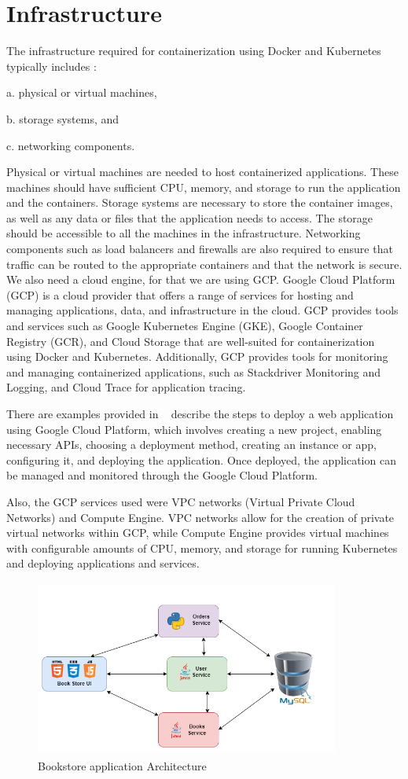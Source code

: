 \section{Infrastructure}
The infrastructure required for containerization using Docker and Kubernetes typically includes :

a. physical or virtual machines,

b. storage systems, and 

c. networking components. 

Physical or virtual machines are needed to host containerized applications. These machines should have sufficient CPU, memory, and storage to run the application and the containers. Storage systems are necessary to store the container images, as well as any data or files that the application needs to access. The storage should be accessible to all the machines in the infrastructure. Networking components such as load balancers and firewalls are also required to ensure that traffic can be routed to the appropriate containers and that the network is secure.
We also need a cloud engine, for that we are using GCP. Google Cloud Platform (GCP) is a cloud provider that offers a range of services for hosting and managing applications, data, and infrastructure in the cloud. GCP provides tools and services such as Google Kubernetes Engine (GKE), Google Container Registry (GCR), and Cloud Storage that are well-suited for containerization using Docker and Kubernetes. Additionally, GCP provides tools for monitoring and managing containerized applications, such as Stackdriver Monitoring and Logging, and Cloud Trace for application tracing.

There are examples provided in ~\cite{gupta2020deploy} describe the steps to deploy a web application using Google Cloud Platform, which involves creating a new project, enabling necessary APIs, choosing a deployment method, creating an instance or app, configuring it, and deploying the application. Once deployed, the application can be managed and monitored through the Google Cloud Platform.

Also, the GCP services used were VPC networks (Virtual Private Cloud Networks) and Compute Engine. VPC networks allow for the creation of private virtual networks within GCP, while Compute Engine provides virtual machines with configurable amounts of CPU, memory, and storage for running Kubernetes and deploying applications and services.
\begin{figure}
    \centering
    \includegraphics[width=10cm, height=5.8cm]{images/MS_architecture.png}
    \caption{Bookstore application Architecture}
    \label{fig:my_label}
\end{figure}
